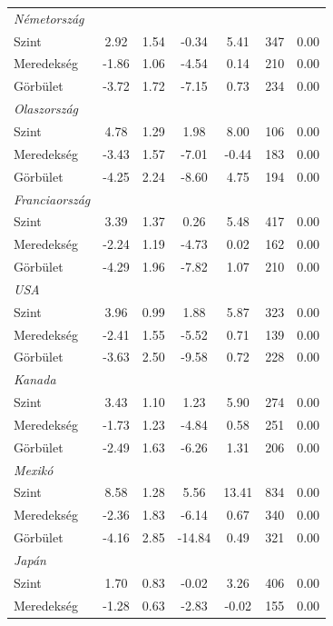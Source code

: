 \documentclass[12pt,bibliography=totoc]{article}
\begin{document}
\begin{table}[H]
\begin{tabular}{l c c c c c c}
\textit{Németország}			&		&		&		&		&		&		\\
Szint						&	 2.92 &	1.54	&	-0.34	&	5.41	&	347	&	0.00	\\
Meredekség				&	-1.86	&	1.06	&	-4.54	&	0.14	&	210	&	0.00	\\
\medskip													
Görbület					&	-3.72	&	1.72	&	-7.15	&	0.73	&	234	&	0.00	\\
\textit{Olaszország}			&		&		&		&		&		&		\\
Szint						&	4.78	&	1.29	&	1.98	&	8.00	&	106	&	0.00	\\
Meredekség				&	-3.43	&	1.57	&	-7.01	&	-0.44	&	183	&	0.00	\\
\medskip													
Görbület					&	-4.25	&	2.24	&	-8.60	&	4.75	&	194	&	0.00	\\
\textit{Franciaország}			&		&		&		&		&		&		\\
Szint						&	3.39	&	1.37	&	0.26	&	5.48	&	417	&	0.00	\\
Meredekség				&	-2.24	&	1.19	&	-4.73	&	0.02	&	162	&	0.00	\\
\medskip													
Görbület					&	-4.29	&	1.96	&	-7.82	&	1.07	&	210	&	0.00	\\
\textit{USA}				&		&		&		&		&		&		\\
Szint						&	3.96	&	0.99	&	1.88	&	5.87	&	323	&	0.00	\\
Meredekség				&	-2.41	&	1.55	&	-5.52	&	0.71	&	139	&	0.00	\\
\medskip													
Görbület					&	-3.63	&	2.50	&	-9.58	&	0.72	&	228	&	0.00	\\
\textit{Kanada}				&		&		&		&		&		&		\\
Szint						&	3.43	&	1.10	&	1.23	&	5.90	&	274	&	0.00	\\
Meredekség				&	-1.73	&	1.23	&	-4.84	&	0.58	&	251	&	0.00	\\
\medskip													
Görbület					&	-2.49	&	1.63	&	-6.26	&	1.31	&	206	&	0.00	\\
\textit{Mexikó}				&		&		&		&		&		&		\\
Szint						&	8.58	&	1.28	&	5.56	&	13.41&	834	&	0.00	\\
Meredekség				&	-2.36	&	1.83	&	-6.14	&	0.67	&	340	&	0.00	\\
\medskip													
Görbület					&	-4.16	&	2.85&	-14.84&	0.49	&	321	&	0.00	\\
\textit{Japán}				&		&		&		&		&		&		\\
Szint						&	1.70	&	0.83	&	-0.02	&	3.26	&	406	&	0.00	\\
Meredekség				&	-1.28	&	0.63	&	-2.83	&	-0.02	&	155	&	0.00	\\

\end{tabular}
\end{table}
\end{document}
